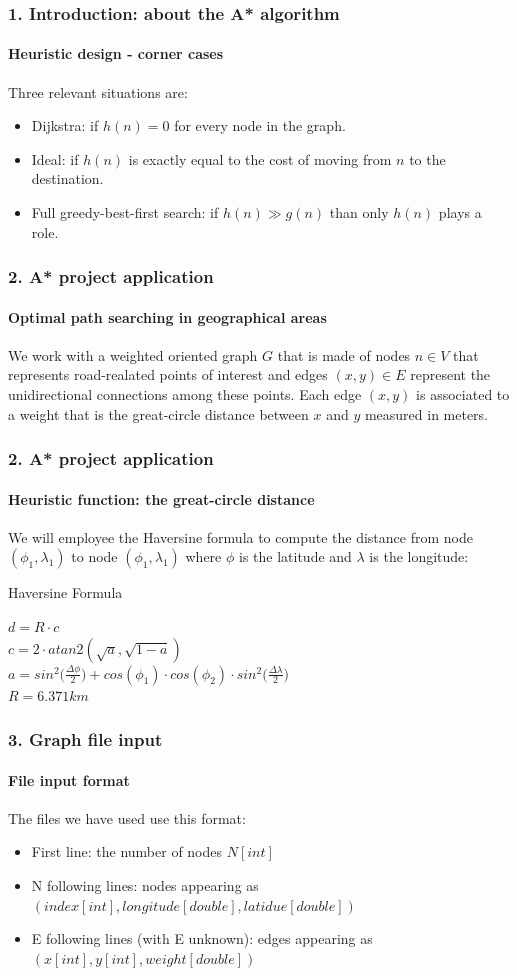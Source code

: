 \documentclass[12pt]{beamer}
\begin{document}
	\begin{frame}
		\frametitle{1. Introduction: about the A* algorithm}
		\framesubtitle{Heuristic design - corner cases}
		Three relevant situations are:
		\begin{itemize}
			\item Dijkstra: if $h(n)=0$ for every node in the graph.
			\item Ideal: if $h(n)$ is exactly equal to the cost of moving from $n$ to
				  the destination.
			\item Full greedy-best-first search: if $h(n) \gg g(n)$ than only $h(n)$ plays a role.
		\end{itemize}
	\end{frame}
	\begin{frame}
		\frametitle{2. A* project application}
		\framesubtitle{Optimal path searching in geographical areas}
		We work with a weighted oriented graph $G$ that is made of nodes $n \in V$ that represents
		road-realated points of interest and edges $(x,y) \in E$ represent the unidirectional connections among these points.
		Each edge $(x, y)$ is associated to a weight that is the great-circle distance between $x$ and $y$ measured
		in meters.
	\end{frame}
	\begin{frame}
		\frametitle{2. A* project application}
		\framesubtitle{Heuristic function: the great-circle distance}
		We will employee the Haversine formula to compute the distance from node $(\phi_1,\lambda_1)$
		to node $(\phi_1,\lambda_1)$ where $\phi$ is the latitude and $\lambda$ is the longitude:
		
		\begin{block}{Haversine Formula}
			\begin{center}
				$d = R \cdot c$\\
				$c = 2 \cdot atan2(\sqrt{a},\sqrt{1-a})$\\
				$a = sin^2\Big({\frac{\Delta \phi}{2}}\Big) + cos(\phi_1) \cdot cos(\phi_2) \cdot sin^2\Big({\frac{\Delta \lambda}{2}}\Big)$
				\\$R=6.371km$
			\end{center}
		\end{block}
	\end{frame}
	\begin{frame}
		\frametitle{3. Graph file input}
		\framesubtitle{File input format}
		The files we have used use this format:
		\begin{itemize}
			\item First line: the number of nodes $N[int]$
			\item N following lines: nodes appearing as $(index[int], longitude[double], latidue[double])$
			\item E following lines (with E unknown): edges appearing as $(x[int], y[int], weight[double])$
		\end{itemize}
	\end{frame}
\end{document}
